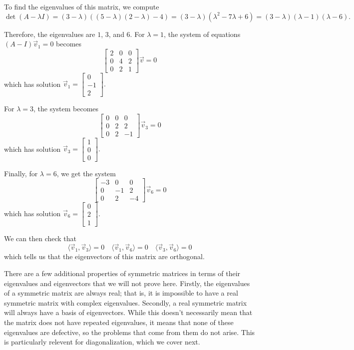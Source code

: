 \begin{exampleSol}
To find the eigenvalues of this matrix, we compute
\[ \det(A - \lambda I) = (3-\lambda)\left( (5-\lambda)(2-\lambda) - 4\right) = (3-\lambda)(\lambda^2 - 7\lambda + 6) = (3-\lambda)(\lambda - 1)(\lambda - 6). \]

Therefore, the eigenvalues are $1$, $3$, and $6$. For $\lambda = 1$, the system of equations $(A - I) \vec{v}_1 = 0$ becomes
\[ \begin{bmatrix} 2 & 0 & 0 \\ 0 & 4 & 2 \\ 0 & 2 &1 \end{bmatrix}\vec{v} = 0 \] which has solution $\vec{v}_1 = \begin{bmatrix} 0 \\ -1 \\ 2 \end{bmatrix}.$

For $\lambda = 3$, the system becomes
\[ \begin{bmatrix} 0 & 0 & 0 \\ 0 & 2 & 2 \\ 0 & 2 & -1 \end{bmatrix} \vec{v}_3 = 0 \] which has solution $\vec{v}_3 = \begin{bmatrix} 1 \\ 0 \\ 0 \end{bmatrix}.$

Finally, for $\lambda = 6$, we get the system
\[ \begin{bmatrix} -3 & 0 & 0 \\ 0 & -1 & 2 \\ 0 & 2 & -4 \end{bmatrix} \vec{v}_6 = 0 \] which has solution $\vec{v}_6 = \begin{bmatrix} 0 \\ 2 \\ 1 \end{bmatrix}.$

We can then check that
\[ \langle \vec{v}_1, \vec{v}_3 \rangle = 0 \quad \langle \vec{v}_1, \vec{v}_6 \rangle = 0  \quad \langle \vec{v}_3, \vec{v}_6 \rangle = 0 \] which tells us that the eigenvectors of this matrix are orthogonal. 
\end{exampleSol}

There are a few additional properties of symmetric matrices in terms of their eigenvalues and eigenvectors that we will not prove here. Firstly, the eigenvalues of a symmetric matrix are always real; that is, it is impossible to have a real symmetric matrix with complex eigenvalues. Secondly, a real symmetric matrix will always have a basis of eigenvectors. While this doesn't necessarily mean that the matrix does not have repeated eigenvalues, it means that none of these eigenvalues are defective, so the problems that come from them do not arise. This is particularly relevent for diagonalization, which we cover next.

